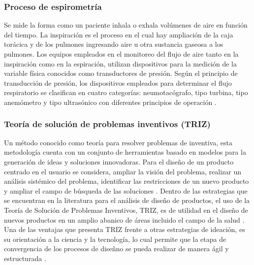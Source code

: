 \documentclass[12pt]{article}
\begin{document}
\subsubsection{Proceso de espirometr\'ia}
Se mide la forma como un paciente inhala o exhala vol\'umenes de aire en funci\'on del tiempo. La inspiraci\'on es el proceso en el cual hay ampliaci\'on de la caja tor\'acica y de los pulmones ingresando aire u otra sustancia gaseosa a los pulmones. Los equipos empleados en el monitoreo del flujo de aire tanto en la inspiraci\'on como en la espiraci\'on, utilizan dispositivos para la medici\'on de la variable f\'isica conocidos como transductores de presi\'on. Seg\'un el principio de transducci\'on de presi\'on, los dispositivos empleados para determinar el flujo respiratorio se clasifican en cuatro categor\'ias: neumotac\'ografo, tipo turbina, tipo anem\'ometro y tipo ultras\'onico con diferentes principios de operaci\'on \cite{14}. 



\subsubsection{Teor\'ia de soluci\'on de problemas inventivos (TRIZ)}

Un m\'etodo conocido como teor\'ia para resolver problemas de inventiva, esta metodolog\'ia cuenta con un conjunto de herramientas basado en modelos para la generaci\'on de ideas y soluciones innovadoras. Para el dise\~{n}o de un producto centrado en el usuario se considera, ampliar la visi\'on del problema, realizar un an\'alisis sist\'emico del problema, identificar las restricciones de un nuevo producto y ampliar el campo de b\'usqueda de las soluciones \cite{15}.  Dentro de las estrategias que se encuentran en la literatura para el an\'alisis de dise\~{n}o de productos, el uso de la Teor\'ia de Soluci\'on de Problemas Inventivos, TRIZ, es de utilidad en el dise\~{n}o de nuevos productos en un amplio abanico de \'areas incluido el campo de la salud \cite{16}.  Una de las ventajas que presenta TRIZ frente a otras estrategias de ideaci\'on, es su orientaci\'on a la ciencia y la tecnolog\'ia, lo cual permite que la etapa de convergencia de los procesos de dise\~{n}no se pueda realizar de manera \'agil y estructurada \cite{17}. 








\end{document}
